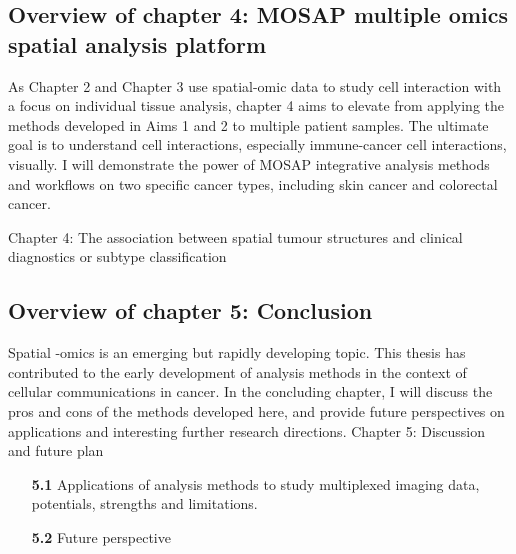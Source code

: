 \subsection{Overview of chapter 4: MOSAP multiple omics spatial analysis platform}
As Chapter 2 and Chapter 3 use spatial-omic data to study cell interaction with a focus on individual tissue analysis, chapter 4 aims to elevate from applying the methods developed in Aims 1 and 2 to multiple patient samples. The ultimate goal is to understand cell interactions, especially immune-cancer cell interactions, visually. I will demonstrate the power of MOSAP integrative analysis methods and workflows on two specific cancer types, including skin cancer and colorectal cancer.

Chapter 4: The association between spatial tumour structures and clinical diagnostics or subtype classification


\subsection{Overview of chapter 5: Conclusion}

Spatial -omics is an emerging but rapidly developing topic. This thesis has contributed to the early development of analysis methods in the context of cellular communications in cancer. In the concluding chapter, I will discuss the pros and cons of the methods developed here, and provide future perspectives on applications and interesting further research directions. 
Chapter 5: Discussion and future plan
\begin{enumerate}[align=left]
    \item[\textbf{5.1}] Applications of analysis methods to study multiplexed imaging data, potentials, strengths and limitations. 
    \item[\textbf{5.2}] Future perspective
\end{enumerate}


% 
% 
